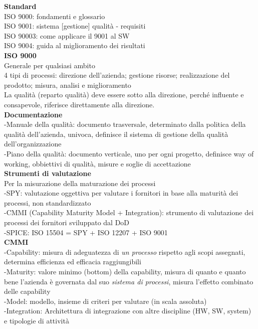 \documentclass{article}
\begin{document}
		\textbf{Standard}\\
		ISO 9000: fondamenti e glossario\\
		ISO 9001: sistema [gestione] qualità - requisiti\\
		ISO 90003: come applicare il 9001 al SW\\
		ISO 9004: guida al miglioramento dei risultati\\
		
		\textbf{ISO 9000}\\
		Generale per qualsiasi ambito\\
		4 tipi di processi: direzione dell'azienda; gestione risorse; realizzazione del prodotto; misura, analisi e miglioramento\\
		La qualità (reparto qualità) deve essere sotto alla direzione, perché influente e consapevole, riferisce direttamente alla direzione.\\
		
		\textbf{Documentazione}\\
		-Manuale della qualità: documento trasversale, determinato dalla politica della qualità dell'azienda, univoca, definisce il sistema di gestione della qualità dell'organizzazione\\
		-Piano della qualità: documento verticale, uno per ogni progetto, definisce way of working, obbiettivi di qualità, misure e soglie di accettazione\\
		
		\textbf{Strumenti di valutazione}\\
		Per la misurazione della maturazione dei processi\\
		-SPY: valutazione oggettiva per valutare i fornitori in base alla maturità dei processi, non standardizzato\\
		-CMMI (Capability Maturity Model + Integration): strumento di valutazione dei processi dei fornitori sviluppato dal DoD\\
		-SPICE: ISO 15504 = SPY + ISO 12207 + ISO 9001\\
		
		\textbf{CMMI}\\
		-Capability: misura di adeguatezza di \textit{un processo} rispetto agli scopi assegnati, determina efficienza ed efficacia raggiungibili\\
		-Maturity: valore minimo (bottom) della capability, misura di quanto e quanto bene l'azienda è governata dal suo \textit{sistema di processi}, misura l'effetto combinato delle capability\\
		-Model: modello, insieme di criteri per valutare (in scala assoluta)\\
		-Integration: Architettura di integrazione con altre discipline (HW, SW, system) e tipologie di attività\\
		
\end{document}
